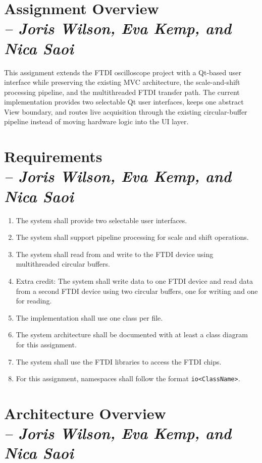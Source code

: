 \section{Assignment Overview \\
\small{\textit{-- Joris Wilson, Eva Kemp, and Nica Saoi}}}
\label{Section::Assignment Overview}

This assignment extends the FTDI oscilloscope project with a Qt-based user interface while preserving the existing MVC architecture, the scale-and-shift processing pipeline, and the multithreaded FTDI transfer path. The current implementation provides two selectable Qt user interfaces, keeps one abstract View boundary, and routes live acquisition through the existing circular-buffer pipeline instead of moving hardware logic into the UI layer.

\section{Requirements \\
\small{\textit{-- Joris Wilson, Eva Kemp, and Nica Saoi}}}
\label{Section::Requirements}

\begin{enumerate}
    \item The system shall provide two selectable user interfaces.
    \item The system shall support pipeline processing for scale and shift operations.
    \item The system shall read from and write to the FTDI device using multithreaded circular buffers.
    \item Extra credit: The system shall write data to one FTDI device and read data from a second FTDI device using two circular buffers, one for writing and one for reading.
    \item The implementation shall use one class per file.
    \item The system architecture shall be documented with at least a class diagram for this assignment.
    \item The system shall use the FTDI libraries to access the FTDI chips.
    \item For this assignment, namespaces shall follow the format \texttt{io<ClassName>}.
\end{enumerate}

\section{Architecture Overview \\
\small{\textit{-- Joris Wilson, Eva Kemp, and Nica Saoi}}}
\label{Section::Architecture Overview}

